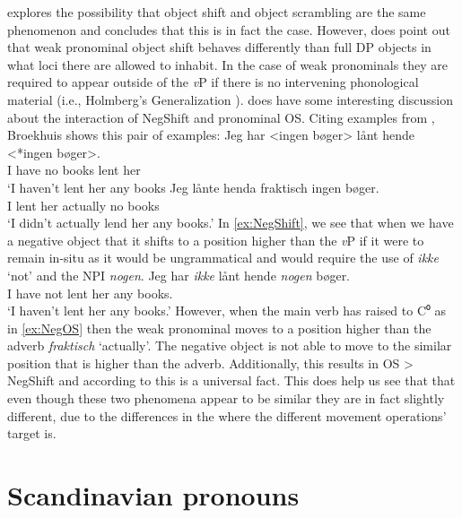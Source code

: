 \documentclass[12pt, letterpaper]{article}
\begin{document}
\ea \cite{broekhuisUnificationObjectShift2020} explores the possibility that object shift and object scrambling are the same phenomenon and concludes that this is in fact the case.
\ex However, \citeauthor[417f]{broekhuisUnificationObjectShift2020} does point out that weak pronominal object shift behaves differently than full DP objects in what loci there are allowed to inhabit. In the case of weak pronominals they are required to appear outside of the \textit{v}P if there is no intervening phonological material (i.e., Holmberg's Generalization \cite{holmbergWordOrderSyntactic1986,holmbergRemarksHolmbergGeneralization1999}).
\ex \citeauthor{broekhuisUnificationObjectShift2020} does have some interesting discussion about the interaction of NegShift and pronominal OS. 
\ex Citing examples from \citet[163ff]{christensenInterfacesNegationSyntax2005}, Broekhuis shows this pair of examples:
	\ea \label{ex:NegShift}
	\gll Jeg har <ingen bøger> lånt hende <*ingen bøger>.\\
	I have no books lent her\\
	\glt `I haven't lent her any books
	\ex \label{ex:NegOS}
	\gll Jeg lånte henda fraktisch ingen bøger.\\
	I lent her actually no books\\
	\glt `I didn't actually lend her any books.'
	\z
\ex In \ref{ex:NegShift}, we see that when we have a negative object that it shifts to a position higher than the \textit{v}P if it were to remain in-situ as it would be ungrammatical and would require the use of \textit{ikke} `not' and the NPI \textit{nogen}.
	\ea
	\gll Jeg har \textit{ikke} lånt hende \textit{nogen} bøger.\\
	I have not lent her any books.\\
	\glt `I haven't lent her any books.'
	\z
\ex However, when the main verb has raised to C⁰ as in \ref{ex:NegOS} then the weak pronominal moves to a position higher than the adverb \textit{fraktisch} `actually'. The negative object is not able to move to the similar position that is higher than the adverb. Additionally, this results in OS > NegShift and according to \citeauthor{broekhuisUnificationObjectShift2020} this is a universal fact.
\ex This does help us see that that even though these two phenomena appear to be similar they are in fact slightly different, due to the differences in the where the different movement operations' target is.
\z 

\section{Scandinavian pronouns} \label{sec:PRONOUNS}
\end{document}
